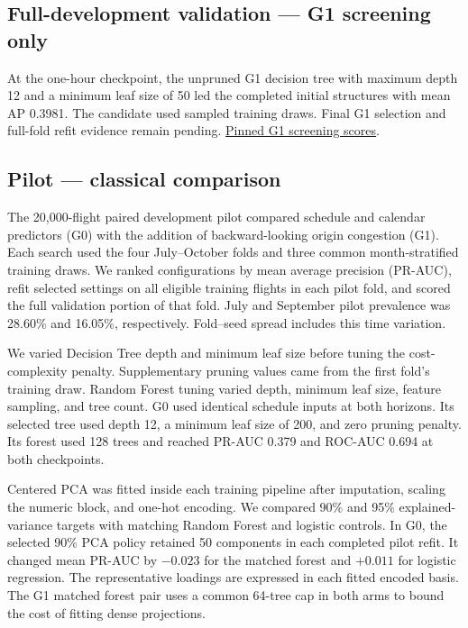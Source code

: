 \documentclass{article}
\begin{document}
\subsection{Full-development validation --- G1 screening only}
At the one-hour checkpoint, the unpruned G1 decision tree with maximum
depth 12 and a minimum leaf size of 50 led the completed initial structures
with mean AP 0.3981. The candidate used sampled training draws.
Final G1 selection and full-fold refit evidence remain pending.
\href{https://github.com/oki-dokii/Flight-Departure-Delay-Prediction-/blob/4780bd7c656e486e4710066c89c7601de3d15b7b/reports/p4_phase_b_full/G1/decision_tree_screen_60m.csv}{Pinned G1 screening scores}.

\subsection{Pilot --- classical comparison}
The 20,000-flight paired development pilot compared schedule and calendar predictors (G0) with the addition of backward-looking origin congestion (G1). Each search used the four July--October folds and three common month-stratified training draws. We ranked configurations by mean average precision (PR-AUC), refit selected settings on all eligible training flights in each pilot fold, and scored the full validation portion of that fold. July and September pilot prevalence was 28.60\% and 16.05\%, respectively. Fold--seed spread includes this time variation.

We varied Decision Tree depth and minimum leaf size before tuning the cost-complexity penalty. Supplementary pruning values came from the first fold's training draw. Random Forest tuning varied depth, minimum leaf size, feature sampling, and tree count. G0 used identical schedule inputs at both horizons. Its selected tree used depth 12, a minimum leaf size of 200, and zero pruning penalty. Its forest used 128 trees and reached PR-AUC 0.379 and ROC-AUC 0.694 at both checkpoints.

Centered PCA was fitted inside each training pipeline after imputation, scaling the numeric block, and one-hot encoding. We compared 90\% and 95\% explained-variance targets with matching Random Forest and logistic controls. In G0, the selected 90\% PCA policy retained 50 components in each completed pilot refit. It changed mean PR-AUC by $-0.023$ for the matched forest and $+0.011$ for logistic regression. The representative loadings are expressed in each fitted encoded basis. The G1 matched forest pair uses a common 64-tree cap in both arms to bound the cost of fitting dense projections.
\end{document}
